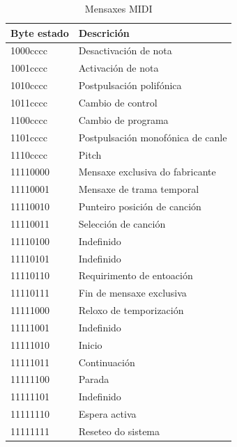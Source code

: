     \begin{table}[htbp]
     \centering
     \begin{tabular}{|l|l|}
      \hline
      \textbf{Byte estado} & \textbf{Descrición} \\
      \hline
      1000cccc & Desactivación de nota \\
      \hline
      1001cccc & Activación de nota \\
      \hline
      1010cccc & Postpulsación polifónica \\
      \hline
      1011cccc & Cambio de control \\
      \hline
      1100cccc & Cambio de programa \\
      \hline
      1101cccc & Postpulsación monofónica de canle \\
      \hline
      1110cccc & Pitch \\
      \hline
      11110000 & Mensaxe exclusiva do fabricante \\
      \hline
      11110001 & Mensaxe de trama temporal \\
      \hline
      11110010 & Punteiro posición de canción \\
      \hline
      11110011 & Selección de canción \\
      \hline
      11110100 & Indefinido \\
      \hline
      11110101 & Indefinido \\
      \hline
      11110110 & Requirimento de entoación \\
      \hline
      11110111 & Fin de mensaxe exclusiva \\
      \hline
      11111000 & Reloxo de temporización \\
      \hline
      11111001 & Indefinido \\
      \hline
      11111010 & Inicio \\
      \hline
      11111011 & Continuación \\
      \hline
      11111100 & Parada \\
      \hline
      11111101 & Indefinido \\
      \hline
      11111110 & Espera activa \\
      \hline
      11111111 & Reseteo do sistema \\
      \hline
     \end{tabular}
     \caption{Mensaxes MIDI}
     \label{tabla:WikipediaMensaxesMIDI}  
    \end{table}
  

